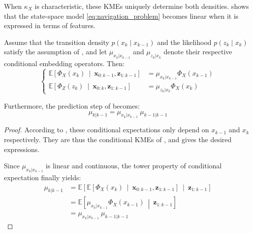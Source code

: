 When $\kappa_X$ is characteristic, these KMEs uniquely determine both densities.  shows that the state-space model \eqref{eq:navigation_problem} becomes linear when it is expressed in terms of features.

\begin{proposition}\label{th:embedded_model}
	Assume that the transition density $p(x_k\mid x_{k-1})$ and the likelihood $p(z_k\mid x_k)$ satisfy the assumption of , and let $\mu_{x_k|x_{k-1}}$ and $\mu_{z_k|x_k}$ denote their respective conditional embedding operators. Then:
	\begin{equation}
		\left\{\begin{aligned}
		\mathbb{E}\left[\Phi_X(x_k)\:\middle|\:\mathbf{x}_{0:k-1},\mathbf{z}_{1:k-1}\right]&=\mu_{x_k|x_{k-1}}\Phi_X(x_{k-1})\\
		\mathbb{E}\left[\Phi_Z(z_k)\:\middle|\:\mathbf{x}_{0:k},\mathbf{z}_{1:k-1}\right]&=\mu_{z_k|x_k}\Phi_X(x_k)
		\end{aligned}\right.
	\end{equation}

	Furthermore, the prediction step of  becomes:
	\begin{equation}
		\mu_{k|k-1}=\mu_{x_k|x_{k-1}}\:\mu_{k-1|k-1}
	\end{equation}
\end{proposition}

\begin{proof}
	According to , these conditional expectations only depend on $x_{k-1}$ and $x_k$ respectively. They are thus the conditional KMEs of , and  gives the desired expressions.

	Since $\mu_{x_k|x_{k-1}}$ is linear and continuous, the tower property of conditional expectation finally yields:
	\begin{equation}
		\begin{aligned}
		\mu_{k|k-1}&=\mathbb{E}\left[\mathbb{E}\left[\Phi_X(x_k)\:\middle|\:\mathbf{x}_{0:k-1},\mathbf{z}_{1:k-1}\right]\:\middle|\:\mathbf{z}_{1:k-1}\right]\\
		&=\mathbb{E}\left[\mu_{x_k|x_{k-1}}\Phi_X(x_{k-1})\:\middle|\:\mathbf{z}_{1:k-1}\right]\\
		&=\mu_{x_k|x_{k-1}}\:\mu_{k-1|k-1}
		\end{aligned}
	\end{equation}
\end{proof}

